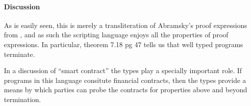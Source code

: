\documentclass[]{acm_proc_article-sp}
\numberwithin{equation}{subsection}
\begin{document}


\begin{mathpar}
\end{mathpar}

\begin{mathpar}
\end{mathpar}

\paragraph{Discussion}
As is easily seen, this is merely a transliteration of Abramsky's
proof expressions from \cite{DBLP:journals/tcs/Abramsky93}, and as
such the scripting language enjoys all the properties of proof
expressions. In particular, theorem 7.18 pg 47 tells us that well
typed programs terminate.

In a discussion of ``smart contract'' the types play a specially
important role. If programs in this language consitute financial
contracts, then the types provide a means by which parties can probe
the contracts for properties above and beyond termination.

\end{document}
